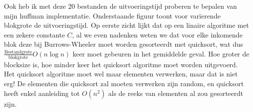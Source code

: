 \documentclass[10pt,a4paper]{report}
\begin{document}
Ook heb ik met deze 20 bestanden de uitvoeringstijd proberen te bepalen van mijn huffman implementatie. 
Onderstaande figuur toont voor var\"ierende blokgrote de uitvoeringstijd. Op eerste zicht lijkt dat op een linaire algoritme met een zekere constante $C$, al we even nadenken weten we dat voor elke inkomende blok deze bij Burrows-Wheeler moet worden gesorteerdt met quicksort, wat dus $\frac{\text{Bestandgrote}}{\text{blokgrote}}O(n\log n)$ keer moet gebeuren in het gemiddelde geval. Hoe groter de blocksize is, hoe minder keer het quicksort algoritme moet worden uitgevoerd. Het quicksort algoritme moet wel maar elementen verwerken, maar dat is niet erg! De elementen die quicksort zal moeten verwerken zijn random, en quicksort heeft enkel aanleiding tot $O(n^{2})$ als de reeks van elementen al zou gesorteerdt zijn.\\
\end{document}
